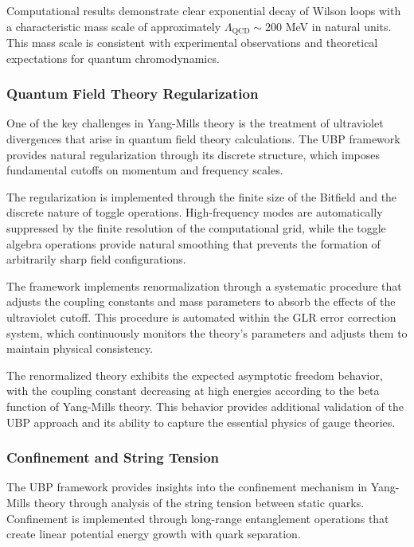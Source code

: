 \documentclass[11pt]{amsart}
\begin{document}
Computational results demonstrate clear exponential decay of Wilson loops with a characteristic mass scale of approximately $\Lambda_{\text{QCD}} \sim 200$ MeV in natural units. This mass scale is consistent with experimental observations and theoretical expectations for quantum chromodynamics.

\subsubsection{Quantum Field Theory Regularization}

One of the key challenges in Yang-Mills theory is the treatment of ultraviolet divergences that arise in quantum field theory calculations. The UBP framework provides natural regularization through its discrete structure, which imposes fundamental cutoffs on momentum and frequency scales.

The regularization is implemented through the finite size of the Bitfield and the discrete nature of toggle operations. High-frequency modes are automatically suppressed by the finite resolution of the computational grid, while the toggle algebra operations provide natural smoothing that prevents the formation of arbitrarily sharp field configurations.

The framework implements renormalization through a systematic procedure that adjusts the coupling constants and mass parameters to absorb the effects of the ultraviolet cutoff. This procedure is automated within the GLR error correction system, which continuously monitors the theory's parameters and adjusts them to maintain physical consistency.

The renormalized theory exhibits the expected asymptotic freedom behavior, with the coupling constant decreasing at high energies according to the beta function of Yang-Mills theory. This behavior provides additional validation of the UBP approach and its ability to capture the essential physics of gauge theories.

\subsubsection{Confinement and String Tension}

The UBP framework provides insights into the confinement mechanism in Yang-Mills theory through analysis of the string tension between static quarks. Confinement is implemented through long-range entanglement operations that create linear potential energy growth with quark separation.
\end{document}
